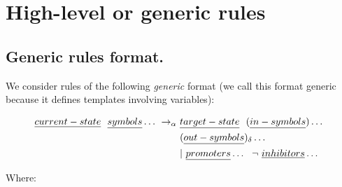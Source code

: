 
\section{High-level or generic rules}

\subsection{\label{sec:cps:genericrules}Generic rules format.}
We consider rules of the following \emph{generic} format 
(we call this format generic because it defines templates involving variables):
\begin{framed}
\vspace{-0.6cm}
\begin{align*}
\emph{current-state} ~~ \emph{symbols} \dots ~ \rightarrow_\alpha ~ & \emph{target-state} ~~ (\emph{in-symbols}) \dots ~~ \\
 & (\emph{out-symbols})_\delta \dots \\
 & | ~  \emph{promoters} \dots ~~ \neg ~  \emph{inhibitors} \dots
\end{align*}
\vspace{-0.8cm}
\end{framed}
Where:
